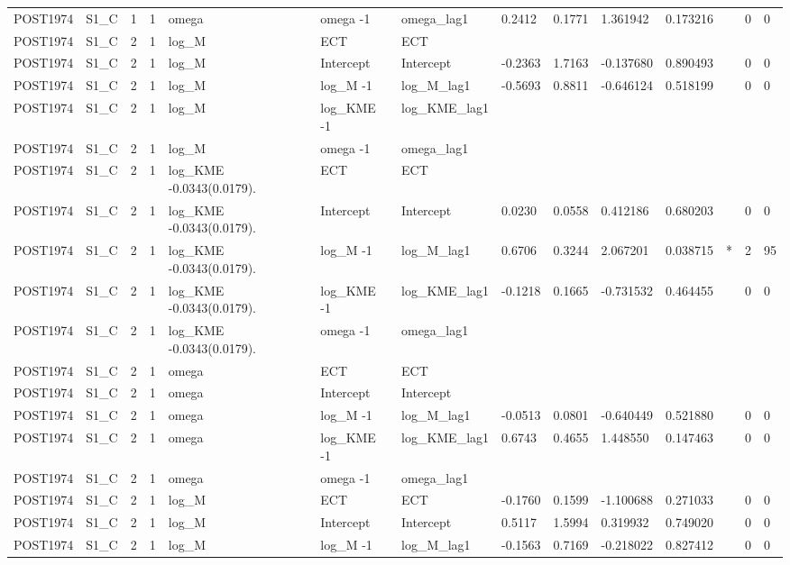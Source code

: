 \begin{tabular}{llllllllllllll}
POST1974 & S1\_C & 1 & 1 & omega & omega -1 & omega\_lag1 & 0.2412 & 0.1771 & 1.361942 & 0.173216 &  & 0 & 0 \\
POST1974 & S1\_C & 2 & 1 & log\_M & ECT & ECT &  &  &  &  &  &  &  \\
POST1974 & S1\_C & 2 & 1 & log\_M & Intercept & Intercept & -0.2363 & 1.7163 & -0.137680 & 0.890493 &  & 0 & 0 \\
POST1974 & S1\_C & 2 & 1 & log\_M & log\_M -1 & log\_M\_lag1 & -0.5693 & 0.8811 & -0.646124 & 0.518199 &  & 0 & 0 \\
POST1974 & S1\_C & 2 & 1 & log\_M & log\_KME -1 & log\_KME\_lag1 &  &  &  &  &  &  &  \\
POST1974 & S1\_C & 2 & 1 & log\_M & omega -1 & omega\_lag1 &  &  &  &  &  &  &  \\
POST1974 & S1\_C & 2 & 1 & log\_KME -0.0343(0.0179). & ECT & ECT &  &  &  &  &  &  &  \\
POST1974 & S1\_C & 2 & 1 & log\_KME -0.0343(0.0179). & Intercept & Intercept & 0.0230 & 0.0558 & 0.412186 & 0.680203 &  & 0 & 0 \\
POST1974 & S1\_C & 2 & 1 & log\_KME -0.0343(0.0179). & log\_M -1 & log\_M\_lag1 & 0.6706 & 0.3244 & 2.067201 & 0.038715 & * & 2 & 95 \\
POST1974 & S1\_C & 2 & 1 & log\_KME -0.0343(0.0179). & log\_KME -1 & log\_KME\_lag1 & -0.1218 & 0.1665 & -0.731532 & 0.464455 &  & 0 & 0 \\
POST1974 & S1\_C & 2 & 1 & log\_KME -0.0343(0.0179). & omega -1 & omega\_lag1 &  &  &  &  &  &  &  \\
POST1974 & S1\_C & 2 & 1 & omega & ECT & ECT &  &  &  &  &  &  &  \\
POST1974 & S1\_C & 2 & 1 & omega & Intercept & Intercept &  &  &  &  &  &  &  \\
POST1974 & S1\_C & 2 & 1 & omega & log\_M -1 & log\_M\_lag1 & -0.0513 & 0.0801 & -0.640449 & 0.521880 &  & 0 & 0 \\
POST1974 & S1\_C & 2 & 1 & omega & log\_KME -1 & log\_KME\_lag1 & 0.6743 & 0.4655 & 1.448550 & 0.147463 &  & 0 & 0 \\
POST1974 & S1\_C & 2 & 1 & omega & omega -1 & omega\_lag1 &  &  &  &  &  &  &  \\
POST1974 & S1\_C & 2 & 1 & log\_M & ECT & ECT & -0.1760 & 0.1599 & -1.100688 & 0.271033 &  & 0 & 0 \\
POST1974 & S1\_C & 2 & 1 & log\_M & Intercept & Intercept & 0.5117 & 1.5994 & 0.319932 & 0.749020 &  & 0 & 0 \\
POST1974 & S1\_C & 2 & 1 & log\_M & log\_M -1 & log\_M\_lag1 & -0.1563 & 0.7169 & -0.218022 & 0.827412 &  & 0 & 0 \\

\end{tabular}
